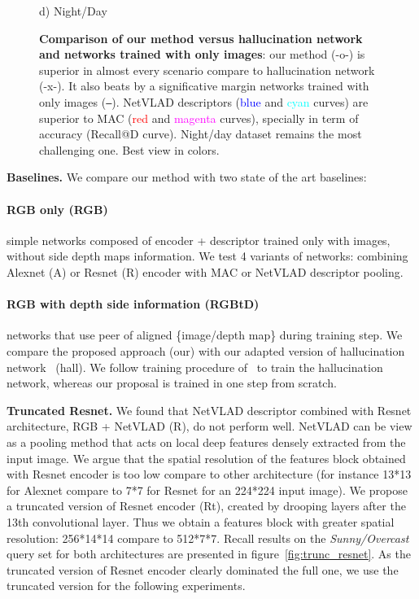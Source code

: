 \begin{figure}
\begin{minipage}{0.85\linewidth}
\begin{minipage}{0.49\linewidth}
		{\scriptsize d) Night/Day}
	\end{minipage}
	
	\end{minipage}

	\caption{\label{fig:results} \textbf{Comparison of our method versus hallucination network and networks trained with only images}: our method (-o-) is superior in almost every scenario compare to hallucination network (-x-). It also beats by a significative margin networks trained with only images (\texttt{--}). NetVLAD descriptors (\textcolor{blue}{blue} and \textcolor{cyan}{cyan} curves) are superior to MAC (\textcolor{red}{red} and \textcolor{magenta}{magenta} curves), specially in term of accuracy (Recall@D curve). Night/day dataset remains the most challenging one.  Best view in colors.}
\end{figure}

\noindent\textbf{Baselines.} We compare our method with two state of the art baselines:
    \paragraph{RGB only (RGB)} simple networks composed of encoder + descriptor trained only with images, without side depth maps information. We test 4 variants of networks: combining Alexnet (A) or Resnet (R) encoder with MAC or NetVLAD descriptor pooling.
    \paragraph{RGB with depth side information (RGBtD)} networks that use peer of aligned \{image/depth map\} during training step. We compare the proposed approach (our) with our adapted version of hallucination network~\cite{Hoffman2016} (hall). We follow training procedure of~\cite{Hoffman2016} to train the hallucination network, whereas our proposal is trained in one step from scratch. 

\noindent\textbf{Truncated Resnet.} We found that NetVLAD descriptor combined with Resnet architecture, RGB + NetVLAD (R), do not perform well. NetVLAD can be view as a pooling method that acts on local deep features densely extracted from the input image. We argue that the spatial resolution of the features block obtained with Resnet encoder is too low compare to other architecture (for instance 13*13 for Alexnet compare to 7*7 for Resnet for an 224*224 input image). We propose a truncated version of Resnet encoder (Rt), created by drooping layers after the 13th convolutional layer. Thus we obtain a features block with greater spatial resolution: 256*14*14 compare to 512*7*7. Recall results on the \textit{Sunny/Overcast} query set for both architectures are presented in figure~\ref{fig:trunc_resnet}. As the truncated version of Resnet encoder clearly dominated the full one, we use the truncated version for the following experiments.

